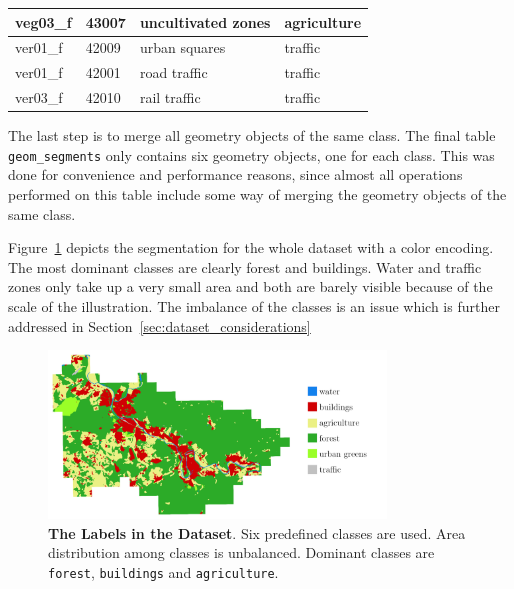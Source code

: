 \begin{table}[]
\begin{tabular}{|l|l|l|l|}
veg03\_f           & 43007                & uncultivated zones             & agriculture                    \\ \hline
ver01\_f           & 42009                & urban squares                  & traffic                        \\ \hline
ver01\_f           & 42001                & road traffic                   & traffic                        \\ \hline
ver03\_f           & 42010                & rail traffic                   & traffic                        \\ \hline
\end{tabular}
\end{table}

The last step is to merge all geometry objects of the same class. The final table \texttt{geom\_segments} only contains six geometry objects, one for each class. This was done for convenience and performance reasons, since almost all operations performed on this table include some way of merging the geometry objects of the same class.

Figure~\ref{fig:dop_label_all} depicts the segmentation for the whole dataset with a color encoding. The most dominant classes are clearly forest and buildings. Water and traffic zones only take up a very small area and both are barely visible because of the scale of the illustration. The imbalance of the classes is an issue which is further addressed in Section~\ref{sec:dataset_considerations}

\begin{figure}[h]
    \centering
    \includegraphics[width=0.8\textwidth]{images/dop_label_all}
    \caption[The Labels in the Dataset]
    {\textbf{The Labels in the Dataset}. Six predefined classes are used. Area distribution among classes is unbalanced. Dominant classes are \texttt{forest}, \texttt{buildings} and \texttt{agriculture}.}
    \label{fig:dop_label_all}
\end{figure}

